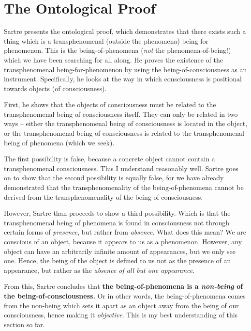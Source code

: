 \section{The Ontological Proof}

Sartre presents the ontological proof, which demonstrates that there exists such a thing which is a transphenomenal (outside the phenomena) being for phenomenon. This is the being-of-phenomena (\emph{not} the phenomena-of-being!) which we have been searching for all along. He proves the existence of the transphenomenal being-for-phenomenon by using the being-of-consciousness as an instrument. Specifically, he looks at the way in which consciousness is positional towards objects (of consciousness).

First, he shows that the objects of consciousness must be related to the transphenomenal being of consciousness itself. They can only be related in two ways -- either the transphenomenal being of consciousness is located in the object, or the transphenomenal being of consciousness is related to the transphenomenal being of phenomena (which we seek).

The first possibility is false, because a concrete object cannot contain a transphenomenal consciousness. This I understand reasonably well. Sartre goes on to show that the second possibility is equally false, for we have already demonstrated that the transphenomenality of the being-of-phenomena cannot be derived from the transphenomenality of the being-of-consciousness.

However, Sartre than proceeds to show a third possibility. Which is that the transphenomenal being of phenomena is found in consciousness not through certain forms of \emph{presence}, but rather from \emph{absence}. What does this mean? We are conscious of an object, because it appears to us as a phenomenon. However, any object can have an arbitrarily infinite amount of appearances, but we only see one. Hence, the being of the object is defined to us not as the presence of an appearance, but rather as the \emph{absence of all but one appearance}.

From this, Sartre concludes that \textbf{the being-of-phenomena is a \emph{non-being} of the being-of-consciousness.} Or in other words, the being-of-phenomena comes from the non-being which sets it apart as an object away from the being of our consciousness, hence making it \emph{objective}. This is my best understanding of this section so far.

